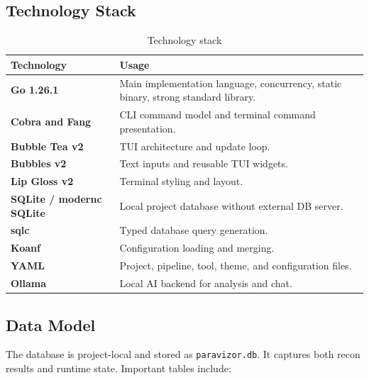 \documentclass[a4paper,12pt]{article}
\begin{document}
\subsection{Technology Stack}

\begin{table}[H]
    \centering
    \begin{tabularx}{\textwidth}{>{\bfseries}p{4cm}X}
        \toprule
        Technology & Usage \\
        \midrule
        Go 1.26.1 & Main implementation language, concurrency, static binary, strong standard library. \\
        Cobra and Fang & CLI command model and terminal command presentation. \\
        Bubble Tea v2 & TUI architecture and update loop. \\
        Bubbles v2 & Text inputs and reusable TUI widgets. \\
        Lip Gloss v2 & Terminal styling and layout. \\
        SQLite / modernc SQLite & Local project database without external DB server. \\
        sqlc & Typed database query generation. \\
        Koanf & Configuration loading and merging. \\
        YAML & Project, pipeline, tool, theme, and configuration files. \\
        Ollama & Local AI backend for analysis and chat. \\
        \bottomrule
    \end{tabularx}
    \caption{Technology stack}
    \label{tab:technology-stack}
\end{table}

\subsection{Data Model}

The database is project-local and stored as \texttt{paravizor.db}. It captures both recon results and runtime state. Important tables include:
\end{document}
